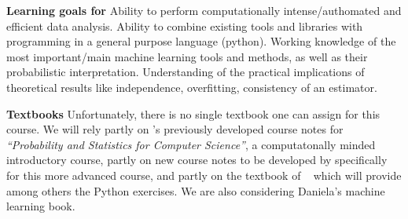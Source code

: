 \item[]{\bf Learning goals for \statcl} Ability to perform computationally intense/authomated and efficient data analysis. Ability to combine existing tools and libraries with programming in a general purpose language (python). 
Working knowledge of the most important/main machine learning tools and methods, as well as their probabilistic interpretation. Understanding of the practical implications of theoretical results like independence, overfitting, consistency of an estimator. 

{\bf Textbooks} Unfortunately, there is no single textbook one can
assign for this course. We will rely partly on \meila's previously
developed course notes for {\it ``Probability and Statistics for
  Computer Science''}, a computatonally minded introductory course,
partly on new course notes to be developed by \meila specifically for
this more advanced course, and partly on the textbook of \astrocl~
which will provide among others the Python exercises. We are also
considering \cite{x} Daniela's machine learning book.

